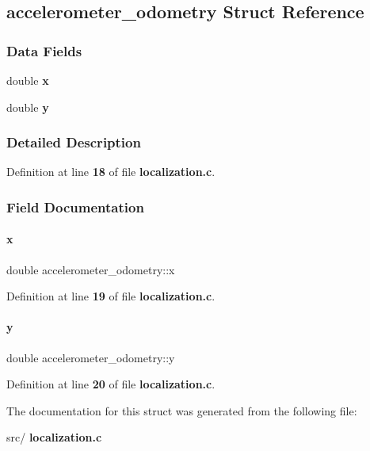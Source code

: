 \subsection{accelerometer\+\_\+odometry Struct Reference}
\label{structaccelerometer__odometry}
\subsubsection*{Data Fields}
\begin{DoxyCompactItemize}
\item 
double \textbf{ x}
\item 
double \textbf{ y}
\end{DoxyCompactItemize}


\subsubsection{Detailed Description}


Definition at line \textbf{ 18} of file \textbf{ localization.\+c}.



\subsubsection{Field Documentation}
\mbox{\label{structaccelerometer__odometry_a83af671d99413a7c480678d5abb9c64a}} 
\paragraph{x}
{\footnotesize\ttfamily double accelerometer\+\_\+odometry\+::x}



Definition at line \textbf{ 19} of file \textbf{ localization.\+c}.

\mbox{\label{structaccelerometer__odometry_a4d812f516efdd477ae9f74fca2a07a2b}} 
\paragraph{y}
{\footnotesize\ttfamily double accelerometer\+\_\+odometry\+::y}



Definition at line \textbf{ 20} of file \textbf{ localization.\+c}.



The documentation for this struct was generated from the following file\+:\begin{DoxyCompactItemize}
\item 
src/\textbf{ localization.\+c}\end{DoxyCompactItemize}
